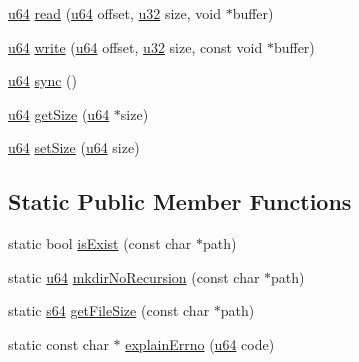 \begin{DoxyCompactItemize}
\item 
\hyperlink{_portable_8h_ad758b7a5c3f18ed79d2fcd23d9f16357}{u64} \hyperlink{classmsfs_1_1_file_ad8adce00c2941f58463327a9f32adc4b}{read} (\hyperlink{_portable_8h_ad758b7a5c3f18ed79d2fcd23d9f16357}{u64} offset, \hyperlink{_portable_8h_a10e94b422ef0c20dcdec20d31a1f5049}{u32} size, void $\ast$buffer)
\item 
\hyperlink{_portable_8h_ad758b7a5c3f18ed79d2fcd23d9f16357}{u64} \hyperlink{classmsfs_1_1_file_a9b4f881613748c75780dee6226c41886}{write} (\hyperlink{_portable_8h_ad758b7a5c3f18ed79d2fcd23d9f16357}{u64} offset, \hyperlink{_portable_8h_a10e94b422ef0c20dcdec20d31a1f5049}{u32} size, const void $\ast$buffer)
\item 
\hyperlink{_portable_8h_ad758b7a5c3f18ed79d2fcd23d9f16357}{u64} \hyperlink{classmsfs_1_1_file_ac2624f63bb15edf854e02f6cab00427e}{sync} ()
\item 
\hyperlink{_portable_8h_ad758b7a5c3f18ed79d2fcd23d9f16357}{u64} \hyperlink{classmsfs_1_1_file_ab539efad18daad3fb4b95ef86309a4ca}{get\+Size} (\hyperlink{_portable_8h_ad758b7a5c3f18ed79d2fcd23d9f16357}{u64} $\ast$size)
\item 
\hyperlink{_portable_8h_ad758b7a5c3f18ed79d2fcd23d9f16357}{u64} \hyperlink{classmsfs_1_1_file_a4680e29a7024919c9e596080cae98741}{set\+Size} (\hyperlink{_portable_8h_ad758b7a5c3f18ed79d2fcd23d9f16357}{u64} size)
\end{DoxyCompactItemize}
\subsection*{Static Public Member Functions}
\begin{DoxyCompactItemize}
\item 
static bool \hyperlink{classmsfs_1_1_file_a2d6470e8a4fd2e040e644727aace4ec6}{is\+Exist} (const char $\ast$path)
\item 
static \hyperlink{_portable_8h_ad758b7a5c3f18ed79d2fcd23d9f16357}{u64} \hyperlink{classmsfs_1_1_file_a1390555ab6f3c20f941d64b2db418eb4}{mkdir\+No\+Recursion} (const char $\ast$path)
\item 
static \hyperlink{_portable_8h_a93680f46d09022794e3923824923b42b}{s64} \hyperlink{classmsfs_1_1_file_a9f97023d0a5c4042efbd4028de07be51}{get\+File\+Size} (const char $\ast$path)
\item 
static const char $\ast$ \hyperlink{classmsfs_1_1_file_a613f7cac09695623a2a89b9b60521deb}{explain\+Errno} (\hyperlink{_portable_8h_ad758b7a5c3f18ed79d2fcd23d9f16357}{u64} code)
\end{DoxyCompactItemize}
